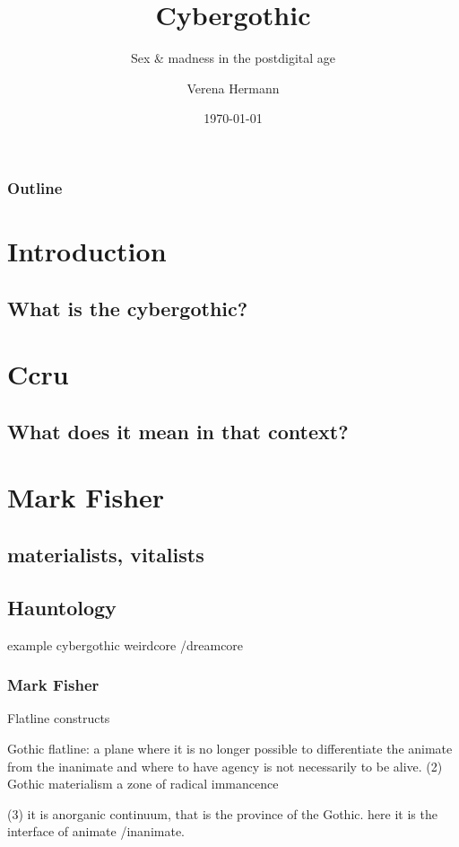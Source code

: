 \documentclass{beamer}
\begin{document}
\title{Cybergothic}
\subtitle{Sex \& madness in the postdigital age}
\author{Verena Hermann}
\date{\today}





\begin{frame}
	\titlepage
\end{frame}



\begin{frame}
\frametitle{Outline}
\tableofcontents
	\section{Introduction}
	\subsection{What is the cybergothic?}
	\section{Ccru}
	\subsection{What does it mean in that context?}
	\section{Mark Fisher}
	\subsection{materialists, vitalists}
	\subsection{Hauntology}


\end{frame}

\begin{frame}
	example cybergothic
	weirdcore /dreamcore
			\end{frame}



\begin{frame}
\frametitle{Mark Fisher}
Flatline constructs

Gothic flatline: a plane where it is no longer possible to differentiate the animate from 
the inanimate and where to have agency is not necessarily to be alive.
(2)
Gothic materialism
a zone of  radical immancence

(3) it is anorganic continuum, that is the province of the Gothic.
here it is the interface of animate /inanimate.

\end{frame}
\end{document}
